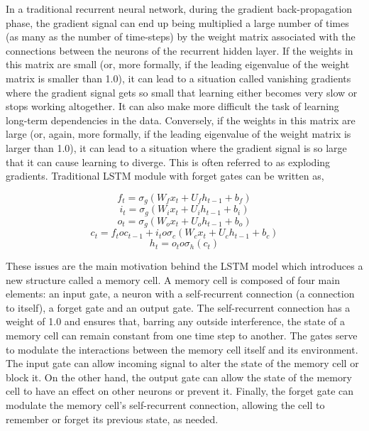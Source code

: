\documentclass[a4paper,11pt,titlepage,drop]{article}%
\begin{document}
In a traditional recurrent neural network, during the gradient back-propagation phase, the gradient signal can end up being multiplied a large number of times (as many as the number of time-steps) by the weight matrix associated with the connections between the neurons of the recurrent hidden layer. If the weights in this matrix are small (or, more formally, if the leading eigenvalue of the weight matrix is smaller than 1.0), it can lead to a situation called vanishing gradients where the gradient signal gets so small that learning either becomes very slow or stops working altogether. It can also make more difficult the task of learning long-term dependencies in the data. Conversely, if the weights in this matrix are large (or, again, more formally, if the leading eigenvalue of the weight matrix is larger than 1.0), it can lead to a situation where the gradient signal is so large that it can cause learning to diverge. This is often referred to as exploding gradients. Traditional LSTM module with forget gates can be written as,

\begin{equation}
					f_t = \sigma_g (W_f x_t + U_fh_{t-1} + b_f)
\end{equation}
\begin{equation}
					i_t = \sigma_g (W_i x_t + U_ih_{t-1} + b_i)
\end{equation}
\begin{equation}
					o_t = \sigma_g (W_o x_t + U_oh_{t-1} + b_o)
\end{equation}
\begin{equation}
					c_t = f_t o c_{t-1} + i_t o \sigma_c(W_cx_t + U_ch_{t-1 } + b_c)
\end{equation}
\begin{equation}
					h_t=o_t o \sigma_h(c_t)
\end{equation}


These issues are the main motivation behind the LSTM model \cite{lstm} which introduces a new structure called a memory cell. A memory cell is composed of four main elements: an input gate, a neuron with a self-recurrent connection (a connection to itself), a forget gate and an output gate. The self-recurrent connection has a weight of 1.0 and ensures that, barring any outside interference, the state of a memory cell can remain constant from one time step to another. The gates serve to modulate the interactions between the memory cell itself and its environment. The input gate can allow incoming signal to alter the state of the memory cell or block it. On the other hand, the output gate can allow the state of the memory cell to have an effect on other neurons or prevent it. Finally, the forget gate can modulate the memory cell's self-recurrent connection, allowing the cell to remember or forget its previous state, as needed.
\end{document}
